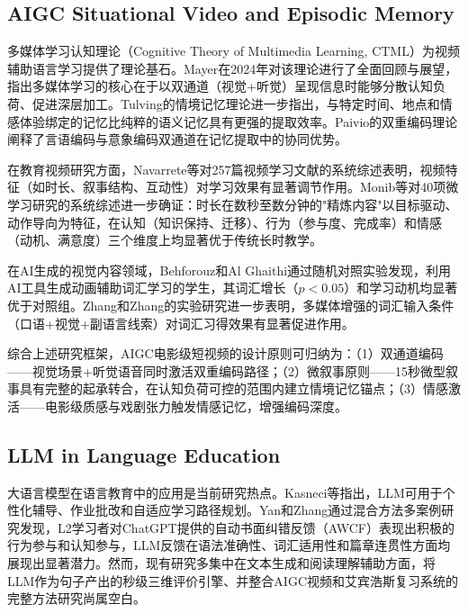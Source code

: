 \documentclass[12pt,a4paper]{ctexart}
\begin{document}
\subsection{AIGC Situational Video and Episodic Memory}

多媒体学习认知理论（Cognitive Theory of Multimedia Learning, CTML）为视频辅助语言学习提供了理论基石。Mayer在2024年对该理论进行了全面回顾与展望，指出多媒体学习的核心在于以双通道（视觉+听觉）呈现信息时能够分散认知负荷、促进深层加工\cite{mayer2024past}。Tulving的情境记忆理论进一步指出，与特定时间、地点和情感体验绑定的记忆比纯粹的语义记忆具有更强的提取效率\cite{tulving1983elements}。Paivio的双重编码理论阐释了言语编码与意象编码双通道在记忆提取中的协同优势\cite{paivio1991dual}。

在教育视频研究方面，Navarrete等\cite{navarrete2025closer}对257篇视频学习文献的系统综述表明，视频特征（如时长、叙事结构、互动性）对学习效果有显著调节作用。Monib等\cite{khan2025microlearning}对40项微学习研究的系统综述进一步确证：时长在数秒至数分钟的"精炼内容"以目标驱动、动作导向为特征，在认知（知识保持、迁移）、行为（参与度、完成率）和情感（动机、满意度）三个维度上均显著优于传统长时教学。

在AI生成的视觉内容领域，Behforouz和Al Ghaithi\cite{behforouz2025visual}通过随机对照实验发现，利用AI工具生成动画辅助词汇学习的学生，其词汇增长（$p<0.05$）和学习动机均显著优于对照组。Zhang和Zhang\cite{zhang2024multimedia}的实验研究进一步表明，多媒体增强的词汇输入条件（口语+视觉+副语言线索）对词汇习得效果有显著促进作用。

综合上述研究框架，AIGC电影级短视频的设计原则可归纳为：（1）双通道编码——视觉场景+听觉语音同时激活双重编码路径；（2）微叙事原则——15秒微型叙事具有完整的起承转合，在认知负荷可控的范围内建立情境记忆锚点；（3）情感激活——电影级质感与戏剧张力触发情感记忆，增强编码深度。

\subsection{LLM in Language Education}

大语言模型在语言教育中的应用是当前研究热点。Kasneci等指出，LLM可用于个性化辅导、作业批改和自适应学习路径规划\cite{kasneci2023chatgpt}。Yan和Zhang\cite{yan2024l2}通过混合方法多案例研究发现，L2学习者对ChatGPT提供的自动书面纠错反馈（AWCF）表现出积极的行为参与和认知参与，LLM反馈在语法准确性、词汇适用性和篇章连贯性方面均展现出显著潜力。然而，现有研究多集中在文本生成和阅读理解辅助方面，将LLM作为句子产出的秒级三维评价引擎、并整合AIGC视频和艾宾浩斯复习系统的完整方法研究尚属空白。
\end{document}
